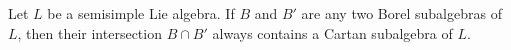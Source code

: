 Let $L$ be a semisimple Lie algebra. If $B$ and $B'$ are any two Borel subalgebras of $L$, then their intersection $B \cap B'$ always contains a Cartan subalgebra of $L$.
